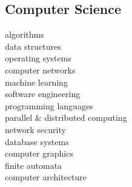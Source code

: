 \begin{minipage}[t]{0.33\textwidth}
\subsection{Computer Science}
algorithms \\
data structures \\
operating systems \\
computer networks \\
machine learning \\
software engineering \\
programming languages \\ 
parallel \& distributed computing \\
network security \\
database systems \\
computer graphics \\
finite automata \\
computer architecture \\

\sectionspace






\end{minipage} %
\hfill
%
%
